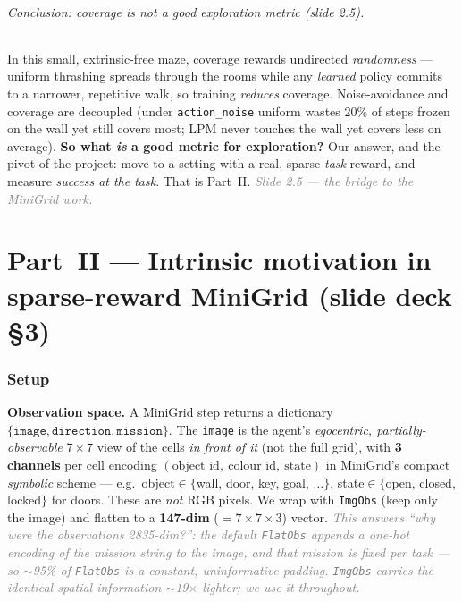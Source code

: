 \documentclass[11pt]{article}
\newcommand{\note}[1]{\textcolor{gray}{\small\emph{#1}}}
\begin{document}
\paragraph{Conclusion: coverage is not a good exploration metric (slide 2.5).} In this small,
extrinsic-free maze, coverage rewards undirected \emph{randomness} --- uniform thrashing spreads
through the rooms while any \emph{learned} policy commits to a narrower, repetitive walk, so training
\emph{reduces} coverage. Noise-avoidance and coverage are decoupled (under \texttt{action\_noise}
uniform wastes $20\%$ of steps frozen on the wall yet still covers most; LPM never touches the wall yet
covers less on average). \textbf{So what \emph{is} a good metric for exploration?} Our answer, and the
pivot of the project: move to a setting with a real, sparse \emph{task} reward, and measure
\emph{success at the task}. That is Part~II. \note{Slide 2.5 --- the bridge to the MiniGrid work.}

\part*{Part~II --- Intrinsic motivation in sparse-reward MiniGrid (slide deck \S3)}

\section{Setup}\label{sec:mgsetup}
\textbf{Observation space.} A MiniGrid step returns a dictionary
$\{\texttt{image}, \texttt{direction}, \texttt{mission}\}$. The \texttt{image} is the agent's
\emph{egocentric, partially-observable} $7\times7$ view of the cells \emph{in front of it} (not the
full grid), with \textbf{3 channels} per cell encoding $(\text{object id},\ \text{colour id},\
\text{state})$ in MiniGrid's compact \emph{symbolic} scheme --- e.g.\ object$\in\{$wall, door, key,
goal, $\dots\}$, state$\in\{$open, closed, locked$\}$ for doors. These are \emph{not} RGB pixels. We
wrap with \texttt{ImgObs} (keep only the image) and flatten to a \textbf{147-dim}
($=7\!\times\!7\!\times\!3$) vector. \note{This answers ``why were the observations 2835-dim?'': the
default \texttt{FlatObs} \emph{appends} a one-hot encoding of the mission string to the image, and that
mission is fixed per task --- so $\sim$95\% of \texttt{FlatObs} is a constant, uninformative padding.
\texttt{ImgObs} carries the identical spatial information $\sim$19$\times$ lighter; we use it
throughout.}
\end{document}
